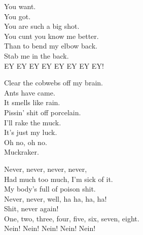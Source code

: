 
\label{album:12-bar-bruise}




You want. \\
You got. \\
You are such a big shot. \\
You cunt you know me better. \\
Than to bend my elbow back. \\
Stab me in the back. \\

EY EY EY EY EY EY EY EY! \\




Clear the cobwebs off my brain. \\
Ants have came. \\
It smells like rain. \\

Pissin' shit off porcelain. \\
I'll rake the muck. \\
It's just my luck. \\

Oh no, oh no. \\
Muckraker. \\




Never, never, never, never, \\
Had much too much, I'm sick of it. \\
My body's full of poison shit. \\
Never, never, well, ha ha, ha, ha! \\

Shit, never again! \\

One, two, three, four, five, six, seven, eight. \\
Nein! Nein! Nein! Nein! Nein! \\

